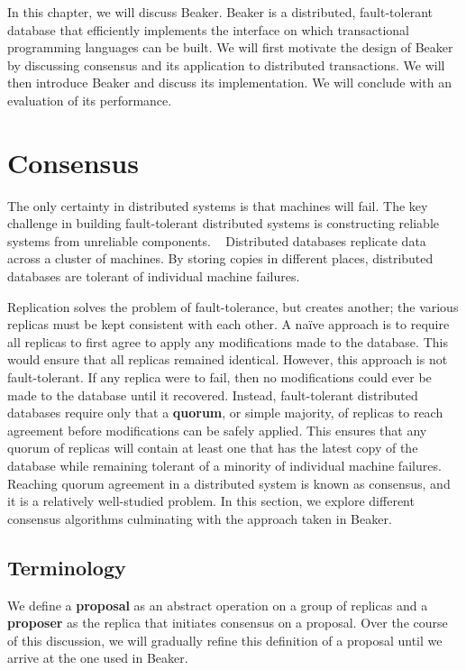 \documentclass[../main.tex]{subfiles}
\begin{document}
In this chapter, we will discuss Beaker. Beaker is a distributed, fault-tolerant database that
efficiently implements the interface on which transactional programming languages can be built. We
will first motivate the design of Beaker by discussing consensus and its application to distributed
transactions. We will then introduce Beaker and discuss its implementation. We will conclude with an
evaluation of its performance.

\section{Consensus}
The only certainty in distributed systems is that machines will fail. The key challenge in building
fault-tolerant distributed systems is constructing reliable systems from unreliable components.
~\cite{reliability} Distributed databases replicate data across a cluster of machines. By storing
copies in different places, distributed databases are tolerant of individual machine failures.

Replication solves the problem of fault-tolerance, but creates another; the various replicas must be
kept consistent with each other. A na\"ive approach is to require all replicas to first agree to
apply any modifications made to the database. This would ensure that all replicas remained
identical. However, this approach is not fault-tolerant. If any replica were to fail, then no
modifications could ever be made to the database until it recovered. Instead, fault-tolerant
distributed databases require only that a \textbf{quorum}, or simple majority, of replicas to reach
agreement before modifications can be safely applied. This ensures that any quorum of replicas will
contain at least one that has the latest copy of the database while remaining tolerant of a minority
of individual machine failures. Reaching quorum agreement in a distributed system is known as
consensus, and it is a relatively well-studied problem. In this section, we explore different
consensus algorithms culminating with the approach taken in Beaker.

  \subsection{Terminology}
  We define a \textbf{proposal} as an abstract operation on a group of replicas and a
  \textbf{proposer} as the replica that initiates consensus on a proposal. Over the course of this
  discussion, we will gradually refine this definition of a proposal until we arrive at the one used
  in Beaker.
\end{document}

